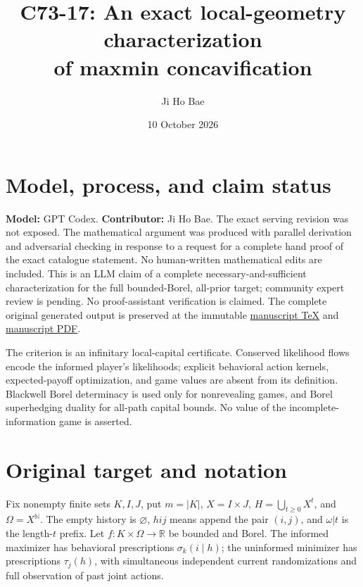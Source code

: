 \documentclass[11pt,a4paper]{article}
\title{C73-17: An exact local-geometry characterization\\of maxmin concavification}
\author{Ji Ho Bae}
\date{10 October 2026}
\begin{document}
\maketitle

\section*{Model, process, and claim status}
\textbf{Model:} GPT Codex. \textbf{Contributor:} Ji Ho Bae.
The exact serving revision was not exposed. The mathematical argument was
produced with parallel derivation and adversarial checking in response to a
request for a complete hand proof of the exact catalogue statement.
No human-written mathematical edits are included. This is an LLM claim of a
complete necessary-and-sufficient characterization for the full bounded-Borel,
all-prior target; community expert review is pending. No proof-assistant
verification is claimed.
The complete original generated output is preserved at the immutable
\href{https://github.com/jbaelaw/maxmin-concavification-characterization/blob/448392472b35ef2303148f78fbbd819147bab774/paper/Proof.tex}{manuscript TeX}
and \href{https://github.com/jbaelaw/maxmin-concavification-characterization/blob/448392472b35ef2303148f78fbbd819147bab774/paper/Proof.pdf}{manuscript PDF}.

The criterion is an infinitary local-capital certificate. Conserved likelihood
flows encode the informed player's likelihoods; explicit behavioral action
kernels, expected-payoff optimization, and game values are absent from its
definition. Blackwell Borel determinacy is used only for nonrevealing games,
and Borel superhedging duality for all-path capital bounds. No value of the
incomplete-information game is asserted.

\section{Original target and notation}

Fix nonempty finite sets \(K,I,J\), put \(m=|K|\), \(X=I\times J\), \(H=\bigcup_{t\ge0}X^t\), and \(\Omega=X^{\mathbb N}\). The empty history is \(\varnothing\), \(hij\) means append the pair \((i,j)\), and \(\omega|t\) is the length-\(t\) prefix. Let \(f:K\times\Omega\to\mathbb R\) be bounded and Borel. The informed maximizer has behavioral prescriptions \(\sigma_k(i\mid h)\); the uninformed minimizer has prescriptions \(\tau_j(h)\), with simultaneous independent current randomizations and full observation of past joint actions.
\end{document}
